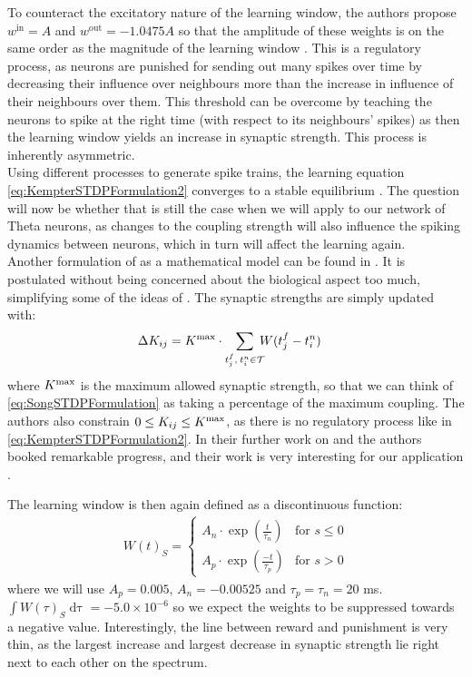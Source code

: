 To counteract the excitatory nature of the learning window, the authors propose $w^{\mathrm{in}} = A$ and $w^{\mathrm{out}} = -1.0475A$ so that the amplitude of these weights is on the same order as the magnitude of the learning window \cite{Kempter1999}. This is a regulatory process, as neurons are punished for sending out  many spikes over time by decreasing their influence over neighbours more than the increase in influence of their neighbours over them. This threshold can be overcome by teaching the neurons to spike at the right time (with respect to its neighbours' spikes) as then the learning window yields an increase in synaptic strength. This process is inherently asymmetric. \\

Using different processes to generate spike trains, the learning equation \eqref{eq:KempterSTDPFormulation2} converges to a stable equilibrium \cite{Kempter1999}. The question will now be whether that is still the case when we will apply \STDP to our network of Theta neurons, as changes to the coupling strength will also influence the spiking dynamics between neurons, which in turn will affect the learning again.\\

Another formulation of \STDP as a mathematical model can be found in \cite{Song2000}. It is postulated without being concerned about the biological aspect too much, simplifying some of the ideas of \cite{Kempter1999}. The synaptic strengths are simply updated with:
\begin{align}
\Delta K_{ij} &= K^{\rm max} \cdot \sum_{t_{j}^{f}, \: t_i^{n} \in \mathcal{T}} \hspace{-2mm} W (t_{j}^{f}-t_i^{n} ) \label{eq:SongSTDPFormulation}
\end{align}
where $K^{\rm max}$ is the maximum allowed synaptic strength, so that we can think of \eqref{eq:SongSTDPFormulation} as taking a percentage of the maximum coupling. The authors also constrain $0 \leq K_{ij} \leq K^{\rm max}$, as there is no regulatory process like in \eqref{eq:KempterSTDPFormulation2}. In their further work on \STDP and \IP the authors booked remarkable progress, and their work is very interesting for our application \cite{Song2017}. 

The learning window is then again defined as a discontinuous function:
\begin{align}
W(t)_S =
\begin{cases}
A_{n} \cdot \exp \left(\frac{t}{\tau_n}\right)  & \text{for } s \leq 0 \\
A_{p} \cdot \exp \left(\frac{-t}{\tau_p}\right) & \text{for } s > 0 
\end{cases} \label{eq:learningwindowSong2000}
\end{align}
where we will use $A_p = 0.005$, $A_n = -0.00525$ and $\tau_p = \tau_n = 20$ ms. $\int W(\tau)_S \mathop{d \tau} = -5.0 \times 10^{-6}$ so we expect the weights to be suppressed towards a negative value. Interestingly, the line between reward and punishment is very thin, as the largest increase and largest decrease in synaptic strength lie right next to each other on the spectrum. \\

